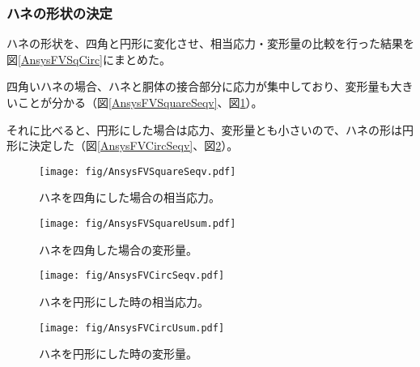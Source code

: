 \documentclass[11pt]{ltjsreport}
\newcommand{\figref}[1]{図\ref{#1}}
\begin{document}
\newpage
\subsubsection{ハネの形状の決定}
ハネの形状を、四角と円形に変化させ、相当応力・変形量の比較を行った結果を\figref{AnsysFVSqCirc}にまとめた。

四角いハネの場合、ハネと胴体の接合部分に応力が集中しており、変形量も大きいことが分かる（\figref{AnsysFVSquareSeqv}、\figref{AnsysFVSquareUsum}）。

それに比べると、円形にした場合は応力、変形量とも小さいので、ハネの形は円形に決定した（\figref{AnsysFVCircSeqv}、\figref{AnsysFVCircUsum}）。

\begin{figure}[htbp]
\begin{minipage}{0.47\textwidth}
\centering
\texttt{[image: fig/AnsysFVSquareSeqv.pdf]}
\caption[ハネを四角にした場合の相当応力]{ハネを四角にした場合の相当応力。}
\label{AnsysFVSquareSeqv}
\end{minipage}
\hfill
\begin{minipage}{0.47\textwidth}
\centering
\texttt{[image: fig/AnsysFVSquareUsum.pdf]}
\caption[ハネを四角にした場合の変形量]{ハネを四角した場合の変形量。}
\label{AnsysFVSquareUsum}
\end{minipage}
\end{figure}

\begin{figure}[htbp]
\begin{minipage}{0.47\textwidth}
\centering
\texttt{[image: fig/AnsysFVCircSeqv.pdf]}
\caption[ハネを円形にした時の相当応力]{ハネを円形にした時の相当応力。}
\label{AnsysFVCircSeqv}
\end{minipage}
\hfill
\begin{minipage}{0.47\textwidth}
\centering
\texttt{[image: fig/AnsysFVCircUsum.pdf]}
\caption[ハネを円形にした時の変形量]{ハネを円形にした時の変形量。}
\label{AnsysFVCircUsum}
\end{minipage}
\end{figure}
\fi%
\end{document}
